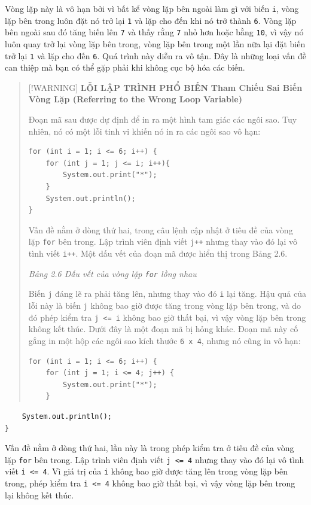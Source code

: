 Vòng lặp này là vô hạn bởi vì bất kể vòng lặp bên ngoài làm gì với biến
\texttt{i}, vòng lặp bên trong luôn đặt nó trở lại \texttt{1} và lặp cho
đến khi nó trở thành \texttt{6}. Vòng lặp bên ngoài sau đó tăng biến lên
\texttt{7} và thấy rằng \texttt{7} nhỏ hơn hoặc bằng \texttt{10}, vì vậy
nó luôn quay trở lại vòng lặp bên trong, vòng lặp bên trong một lần nữa
lại đặt biến trở lại \texttt{1} và lặp cho đến \texttt{6}. Quá trình này
diễn ra vô tận. Đây là những loại vấn đề can thiệp mà bạn có thể gặp
phải khi không cục bộ hóa các biến.

\begin{quote}
{[}!WARNING{]} \textbf{LỖI LẬP TRÌNH PHỔ BIẾN} \textbf{Tham Chiếu Sai
Biến Vòng Lặp (Referring to the Wrong Loop Variable)}

Đoạn mã sau được dự định để in ra một hình tam giác các ngôi sao. Tuy
nhiên, nó có một lỗi tinh vi khiến nó in ra các ngôi sao vô hạn:

\begin{verbatim}
for (int i = 1; i <= 6; i++) {
    for (int j = 1; j <= i; i++){
        System.out.print("*");
    }
    System.out.println();
}
\end{verbatim}

Vấn đề nằm ở dòng thứ hai, trong câu lệnh cập nhật ở tiêu đề của vòng
lặp \texttt{for} bên trong. Lập trình viên định viết \texttt{j++} nhưng
thay vào đó lại vô tình viết \texttt{i++}. Một dấu vết của đoạn mã được
hiển thị trong Bảng 2.6.

\emph{Bảng 2.6 Dấu vết của vòng lặp \texttt{for} lồng nhau}

Biến \texttt{j} đáng lẽ ra phải tăng lên, nhưng thay vào đó \texttt{i}
lại tăng. Hậu quả của lỗi này là biến \texttt{j} không bao giờ được tăng
trong vòng lặp bên trong, và do đó phép kiểm tra
\texttt{j\ \textless{}=\ i} không bao giờ thất bại, vì vậy vòng lặp bên
trong không kết thúc. Dưới đây là một đoạn mã bị hỏng khác. Đoạn mã này
cố gắng in một hộp các ngôi sao kích thước \texttt{6\ x\ 4}, nhưng nó
cũng in vô hạn:

\begin{verbatim}
for (int i = 1; i <= 6; i++) {
    for (int j = 1; i <= 4; j++) {
        System.out.print("*");
    }
\end{verbatim}
\end{quote}

\begin{verbatim}
    System.out.println();
}
\end{verbatim}

Vấn đề nằm ở dòng thứ hai, lần này là trong phép kiểm tra ở tiêu đề của
vòng lặp \texttt{for} bên trong. Lập trình viên định viết
\texttt{j\ \textless{}=\ 4} nhưng thay vào đó lại vô tình viết
\texttt{i\ \textless{}=\ 4}. Vì giá trị của \texttt{i} không bao giờ
được tăng lên trong vòng lặp bên trong, phép kiểm tra
\texttt{i\ \textless{}=\ 4} không bao giờ thất bại, vì vậy vòng lặp bên
trong lại không kết thúc.

